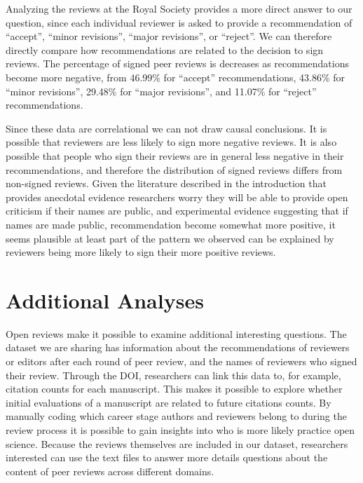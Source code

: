 \documentclass[,jou, a4paper,floatsintext]{apa6}
\begin{document}
Analyzing the reviews at the Royal Society provides a more direct answer to our question, since each individual reviewer is asked to provide a recommendation of \enquote{accept}, \enquote{minor revisions}, \enquote{major revisions}, or \enquote{reject}. We can therefore directly compare how recommendations are related to the decision to sign reviews. The percentage of signed peer reviews is decreases as recommendations become more negative, from 46.99\% for \enquote{accept} recommendations, 43.86\% for \enquote{minor revisions}, 29.48\% for \enquote{major revisions}, and 11.07\% for \enquote{reject} recommendations.

Since these data are correlational we can not draw causal conclusions. It is possible that reviewers are less likely to sign more negative reviews. It is also possible that people who sign their reviews are in general less negative in their recommendations, and therefore the distribution of signed reviews differs from non-signed reviews. Given the literature described in the introduction that provides anecdotal evidence researchers worry they will be able to provide open criticism if their names are public, and experimental evidence suggesting that if names are made public, recommendation become somewhat more positive, it seems plausible at least part of the pattern we observed can be explained by reviewers being more likely to sign their more positive reviews.

\hypertarget{additional-analyses}{%
\section{Additional Analyses}\label{additional-analyses}}

Open reviews make it possible to examine additional interesting questions. The dataset we are sharing has information about the recommendations of reviewers or editors after each round of peer review, and the names of reviewers who signed their review. Through the DOI, researchers can link this data to, for example, citation counts for each manuscript. This makes it possible to explore whether initial evaluations of a manuscript are related to future citations counts. By manually coding which career stage authors and reviewers belong to during the review process it is possible to gain insights into who is more likely practice open science. Because the reviews themselves are included in our dataset, researchers interested can use the text files to answer more details questions about the content of peer reviews across different domains.
\end{document}
